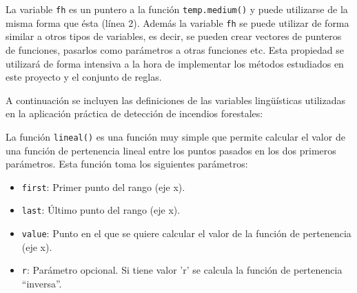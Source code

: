 La variable \lstinline|fh| es un puntero a la función \lstinline|temp.medium()| y puede utilizarse de la misma forma que ésta (línea 2). Además la variable \lstinline|fh| se puede utilizar de forma similar a otros tipos de variables, es decir, se pueden crear vectores de punteros de funciones, pasarlos como parámetros a otras funciones etc. Esta propiedad se utilizará de forma intensiva a la hora de implementar los métodos estudiados en este proyecto y el conjunto de reglas.

A continuación se incluyen las definiciones de las variables lingüísticas utilizadas en la aplicación práctica de detección de incendios forestales:













La función \lstinline|lineal()| es una función muy simple que permite calcular el valor de una función de pertenencia lineal entre los puntos pasados en los dos primeros parámetros. Esta función toma los siguientes parámetros:

\begin{itemize}
\item \lstinline|first|: Primer punto del rango (eje x).
\item \lstinline|last|: Último punto del rango (eje x).
\item \lstinline|value|: Punto en el que se quiere calcular el valor de la función de pertenencia (eje x).
\item \lstinline|r|: Parámetro opcional. Si tiene valor 'r' se calcula la función de pertenencia ``inversa''.
\end{itemize}

